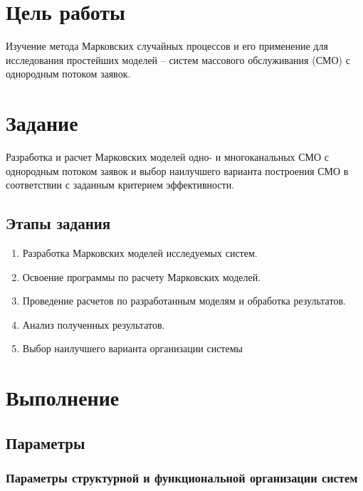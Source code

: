 

\usepackage{graphicx}
\usepackage{multirow}

\def \labnum {1}
\def \labtype {Домашняя}
\def \labsubj {Моделирование}
\def \labauthor {Чебыкин И. Б.}
\def \labgroup {P3301}
\def \labinsp {Муравьева-Витковская Л. А.}
\def \labname {Вариант: 23/5}

\isnametrue
\lstset{
	caption=\lstname,
	basicstyle=\ttfamily\selectfont\scriptsize
}


\section{Цель работы}
Изучение метода Марковских случайных процессов и его
применение для исследования простейших моделей – систем массового
обслуживания (СМО) с однородным потоком заявок.
\section{Задание}
Разработка и расчет Марковских моделей одно- и многоканальных
СМО с однородным потоком заявок и выбор наилучшего варианта
построения СМО в соответствии с заданным критерием эффективности.
\subsection{Этапы задания}
\begin{enumerate}
	\item Разработка Марковских моделей исследуемых систем.
	\item Освоение программы по расчету Марковских моделей.
	\item Проведение расчетов по разработанным моделям и обработка результатов.
	\item Анализ полученных результатов.
	\item Выбор наилучшего варианта организации системы
\end{enumerate}

\section{Выполнение}
\subsection{Параметры}

\subsubsection{Параметры структурной и функциональной организации систем}

